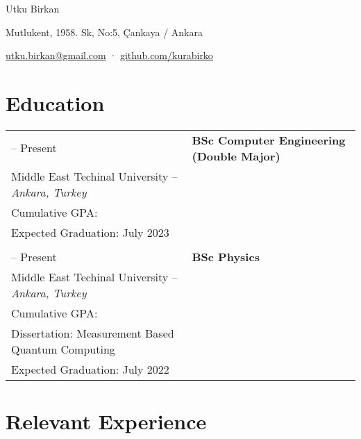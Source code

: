 \documentclass[11pt]{article}
\makeatletter
\newlength{\firstColumnWidth}
\newlength{\tabusep}
\newcommand{\twoNewline}{\tabularnewline & \tabularnewline}
\newcommand\liningnumbers{\addfontfeature{Numbers=Lining}}
\newenvironment{twocols}
    {
    \begin{longtable}[h]{%
        @{}%
        >{\raggedleft}p{\firstColumnWidth}%
        @{\hspace{\tabusep}}%
        >{\arraybackslash\raggedright}p{\dimexpr %
            \linewidth-\firstColumnWidth-\tabusep%
        \relax}%
        @{}%
        }
    } {
        \end{longtable}
    }
\makeatother
\begin{document}
\begin{center}
	{\huge \LibertinusDisplay \foreignlanguage{turkish}{Utku Birkan}} \medskip \par
    Mutlukent, 1958. Sk, No:5, Çankaya / Ankara  \par
	\href{mailto:utku.birkan@gmail.com}{utku.birkan@gmail.com} \hspace{2pt} · \hspace{2pt}
    \href{https://github.com/kurabirko}{github.com/kurabirko}\par
\end{center}

\section{Education}

\begin{twocols}
  2018 -- Present & %
    \textbf{BSc Computer Engineering (Double Major)} \\
    Middle East Techinal University -- \textit{Ankara, Turkey} \\
    Cumulative GPA: \liningnumbers{3.70} \\
    Expected Graduation: July 2023 \twoNewline
  2017 -- Present & %
    \textbf{BSc Physics} \\
    Middle East Techinal University -- \textit{Ankara, Turkey} \\
    Cumulative GPA: \liningnumbers{3.55} \\
    Dissertation: Measurement Based Quantum Computing \\
    Expected Graduation: July 2022
\end{twocols}

\section{Relevant Experience}
\end{document}
